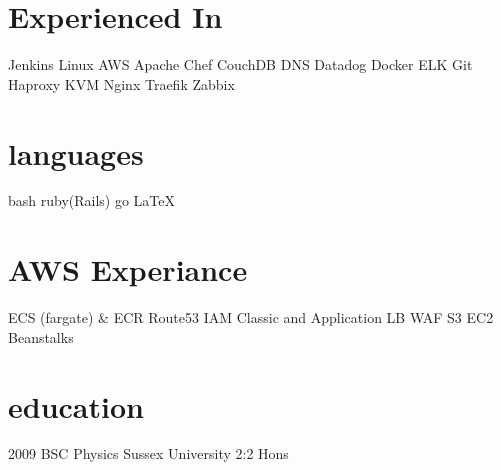 \documentclass[]{friggeri-cv-a4}
\begin{document}
\fancyfoot{}

\begin{aside}
	\section{Experienced In}
		Jenkins
		Linux
    AWS
    Apache
    Chef
    CouchDB
    DNS
    Datadog
    Docker
    ELK
    Git
    Haproxy
    KVM
    Nginx
    Traefik
    Zabbix
  \section{languages}
    bash
		ruby(Rails)
    go
    \LaTeX
  \section{AWS Experiance}
    ECS (fargate) \& ECR
    Route53
    IAM
    Classic and Application LB
    WAF
    S3
    EC2
    Beanstalks
  \section{education}
    2009 BSC Physics Sussex University 2:2 Hons
\end{aside}
\end{document}
